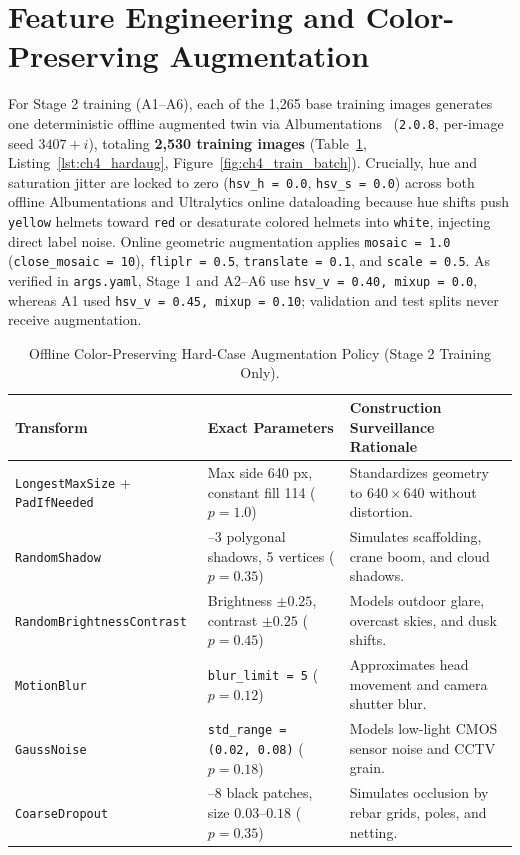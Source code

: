 \section{Feature Engineering and Color-Preserving Augmentation}

For Stage 2 training (A1--A6), each of the 1,265 base training images generates one deterministic offline augmented twin via Albumentations~\cite{buslaev2020albumentations} (\texttt{2.0.8}, per-image seed $3407 + i$), totaling \textbf{2,530 training images} (Table~\ref{tab:ch4_hardaug}, Listing~\ref{lst:ch4_hardaug}, Figure~\ref{fig:ch4_train_batch}). Crucially, hue and saturation jitter are locked to zero (\texttt{hsv\_h = 0.0}, \texttt{hsv\_s = 0.0}) across both offline Albumentations and Ultralytics online dataloading because hue shifts push \texttt{yellow} helmets toward \texttt{red} or desaturate colored helmets into \texttt{white}, injecting direct label noise. Online geometric augmentation applies \texttt{mosaic = 1.0} (\nolinkurl{close_mosaic = 10}), \texttt{fliplr = 0.5}, \texttt{translate = 0.1}, and \texttt{scale = 0.5}. As verified in \texttt{args.yaml}, Stage 1 and A2--A6 use \texttt{hsv\_v = 0.40, mixup = 0.0}, whereas A1 used \texttt{hsv\_v = 0.45, mixup = 0.10}; validation and test splits never receive augmentation.

\begin{table}[htbp]
\centering
\caption{Offline Color-Preserving Hard-Case Augmentation Policy (Stage 2 Training Only).}
\label{tab:ch4_hardaug}
\footnotesize
\renewcommand{\arraystretch}{1.12}
\begin{tabularx}{\textwidth}{|>{\raggedright\arraybackslash}p{4.2cm}|>{\raggedright\arraybackslash}p{4.0cm}|X|}
\hline
\rowcolor{slatehdr}
\textbf{Transform} & \textbf{Exact Parameters} & \textbf{Construction Surveillance Rationale} \\
\hline
\texttt{LongestMaxSize} + \texttt{PadIfNeeded} & Max side 640 px, constant fill 114 ($p=1.0$) & Standardizes geometry to $640 \times 640$ without distortion. \\ \hline
\texttt{RandomShadow} & 1--3 polygonal shadows, 5 vertices ($p=0.35$) & Simulates scaffolding, crane boom, and cloud shadows. \\ \hline
\texttt{RandomBrightnessContrast} & Brightness $\pm 0.25$, contrast $\pm 0.25$ ($p=0.45$) & Models outdoor glare, overcast skies, and dusk shifts. \\ \hline
\texttt{MotionBlur} & \texttt{blur\_limit = 5} ($p=0.12$) & Approximates head movement and camera shutter blur. \\ \hline
\texttt{GaussNoise} & \nolinkurl{std_range = (0.02, 0.08)} ($p=0.18$) & Models low-light CMOS sensor noise and CCTV grain. \\ \hline
\texttt{CoarseDropout} & 1--8 black patches, size $0.03\text{--}0.18$ ($p=0.35$) & Simulates occlusion by rebar grids, poles, and netting. \\ \hline
\end{tabularx}
\end{table}


